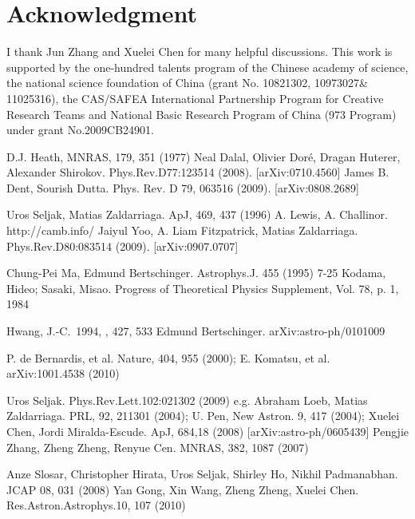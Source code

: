 \documentclass[aps,prl,showpacs,nobibnotes,twocolumn,
nobalancelastpage,superscriptaddress]{revtex4}
\begin{document}
\section{Acknowledgment}
I thank Jun Zhang and Xuelei Chen for many helpful discussions. This work is
supported by the one-hundred talents program of the Chinese 
academy of science, the national science 
foundation of China (grant No. 10821302, 10973027\& 11025316),   the CAS/SAFEA
International Partnership Program for  Creative Research Teams and National
Basic Research Program of China (973 Program) under grant No.2009CB24901. 

\begin{thebibliography}{}
 D.J. Heath, MNRAS, 179, 351 (1977)
  Neal Dalal, Olivier Doré, Dragan Huterer, Alexander Shirokov. 	Phys.Rev.D77:123514
  (2008). [arXiv:0710.4560] 
 James B. Dent, Sourish Dutta. Phys. Rev. D 79, 063516
  (2009). [arXiv:0808.2689]

 Uros Seljak, Matias Zaldarriaga. ApJ, 469, 437 (1996) 
 A. Lewis, A. Challinor. http://camb.info/
 Jaiyul Yoo, A. Liam Fitzpatrick, Matias Zaldarriaga.
  Phys.Rev.D80:083514 (2009). [arXiv:0907.0707]


 Chung-Pei Ma, Edmund Bertschinger. Astrophys.J. 455 (1995) 7-25 
 Kodama, Hideo; Sasaki, Misao. Progress of Theoretical
  Physics Supplement, Vol. 78, p. 1, 1984 

 Hwang, J.-C.\ 1994, \apj, 427, 533 
 Edmund Bertschinger. arXiv:astro-ph/0101009

 P. de Bernardis, et al. Nature, 404, 955 (2000); E. Komatsu, et
  al.  arXiv:1001.4538 (2010)

 Uros Seljak. Phys.Rev.Lett.102:021302 (2009)
\bibitem{21cm} e.g. Abraham Loeb, Matias Zaldarriaga. PRL, 92, 211301 (2004);
  U. Pen, New Astron. 9, 417 (2004); 
  Xuelei Chen, Jordi Miralda-Escude. ApJ, 684,18 (2008) [arXiv:astro-ph/0605439]
  Pengjie Zhang, Zheng Zheng, Renyue Cen. MNRAS, 382, 1087 (2007) 



 Anze Slosar, Christopher Hirata, Uros Seljak, Shirley Ho,
  Nikhil Padmanabhan. 	JCAP 08, 031 (2008)
 Yan Gong, Xin Wang, Zheng Zheng, Xuelei
  Chen. Res.Astron.Astrophys.10, 107 (2010) 


\end{thebibliography}
\end{document}
